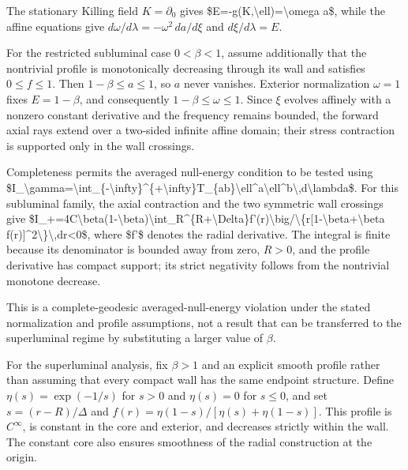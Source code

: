 \documentclass[11pt]{article}
\begin{document}
The stationary Killing field $K=\partial_0$ gives \$E=-g(K,\textbackslash{}ell)=\textbackslash{}omega a\$, while the affine equations give $d\omega/d\lambda=-\omega^2\,da/d\xi$ and $d\xi/d\lambda=E$.

For the restricted subluminal case $0<\beta<1$, assume additionally that the nontrivial profile is monotonically decreasing through its wall and satisfies $0\leq f\leq1$. Then $1-\beta\leq a\leq1$, so $a$ never vanishes. Exterior normalization $\omega=1$ fixes $E=1-\beta$, and consequently $1-\beta\leq\omega\leq1$. Since $\xi$ evolves affinely with a nonzero constant derivative and the frequency remains bounded, the forward axial rays extend over a two-sided infinite affine domain; their stress contraction is supported only in the wall crossings.

Completeness permits the averaged null-energy condition to be tested using \$I\_\textbackslash{}gamma=\textbackslash{}int\_\{-\textbackslash{}infty\}\textasciicircum{}\{+\textbackslash{}infty\}T\_\{ab\}\textbackslash{}ell\textasciicircum{}a\textbackslash{}ell\textasciicircum{}b\textbackslash{},d\textbackslash{}lambda\$. For this subluminal family, the axial contraction and the two symmetric wall crossings give \$I\_+=4C\textbackslash{}beta(1-\textbackslash{}beta)\textbackslash{}int\_R\textasciicircum{}\{R+\textbackslash{}Delta\}f'(r)\textbackslash{}big/\textbackslash{}\{r[1-\textbackslash{}beta+\textbackslash{}beta f(r)]\textasciicircum{}2\textbackslash{}\}\textbackslash{},dr\textless{}0\$, where \$f'\$ denotes the radial derivative. The integral is finite because its denominator is bounded away from zero, $R>0$, and the profile derivative has compact support; its strict negativity follows from the nontrivial monotone decrease.

This is a complete-geodesic averaged-null-energy violation under the stated normalization and profile assumptions, not a result that can be transferred to the superluminal regime by substituting a larger value of $\beta$.

For the superluminal analysis, fix $\beta>1$ and an explicit smooth profile rather than assuming that every compact wall has the same endpoint structure. Define $\eta(s)=\exp(-1/s)$ for $s>0$ and $\eta(s)=0$ for $s\leq0$, and set $s=(r-R)/\Delta$ and $f(r)=\eta(1-s)/[\eta(s)+\eta(1-s)]$. This profile is $C^\infty$, is constant in the core and exterior, and decreases strictly within the wall. The constant core also ensures smoothness of the radial construction at the origin.
\end{document}
